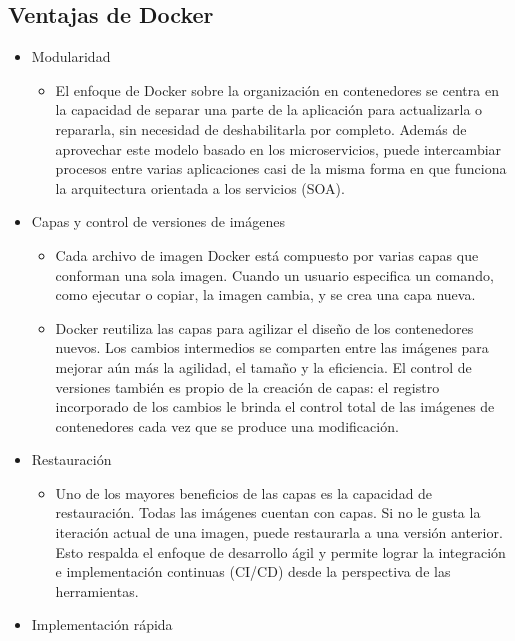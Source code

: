 \documentclass{dense_template}
\begin{document}
\subsection{Ventajas de Docker}
\begin{itemize}
    \item Modularidad
    \begin{itemize}
        \item El enfoque de Docker sobre la organización en contenedores se centra en la capacidad de separar una parte de la aplicación para actualizarla o repararla, sin necesidad de deshabilitarla por completo. Además de aprovechar este modelo basado en los microservicios, puede intercambiar procesos entre varias aplicaciones casi de la misma forma en que funciona la arquitectura orientada a los servicios (SOA).
    \end{itemize}
    \item Capas y control de versiones de imágenes
    \begin{itemize}
        \item Cada archivo de imagen Docker está compuesto por varias capas que conforman una sola imagen. Cuando un usuario especifica un comando, como ejecutar o copiar, la imagen cambia, y se crea una capa nueva.
    \end{itemize}
    \begin{itemize}
        \item Docker reutiliza las capas para agilizar el diseño de los contenedores nuevos. Los cambios intermedios se comparten entre las imágenes para mejorar aún más la agilidad, el tamaño y la eficiencia. El control de versiones también es propio de la creación de capas: el registro incorporado de los cambios le brinda el control total de las imágenes de contenedores cada vez que se produce una modificación.
    \end{itemize}
    \item Restauración
    \begin{itemize}
        \item Uno de los mayores beneficios de las capas es la capacidad de restauración. Todas las imágenes cuentan con capas. Si no le gusta la iteración actual de una imagen, puede restaurarla a una versión anterior. Esto respalda el enfoque de desarrollo ágil y permite lograr la integración e implementación continuas (CI/CD) desde la perspectiva de las herramientas.
    \end{itemize}
    \item Implementación rápida
    \begin{itemize}

\end{itemize}
\end{itemize}
\end{document}
